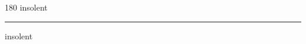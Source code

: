 
\begin{frame}
\begin{center}
\begin{turn}{180}
{\fontsize{2.5cm}{1em}\selectfont insolent}
\end{turn}
\vspace{1em}\par  
\hrule
\vspace{1em}\par  
{\fontsize{2.5cm}{1em}\selectfont insolent}
\end{center}
\end{frame}
